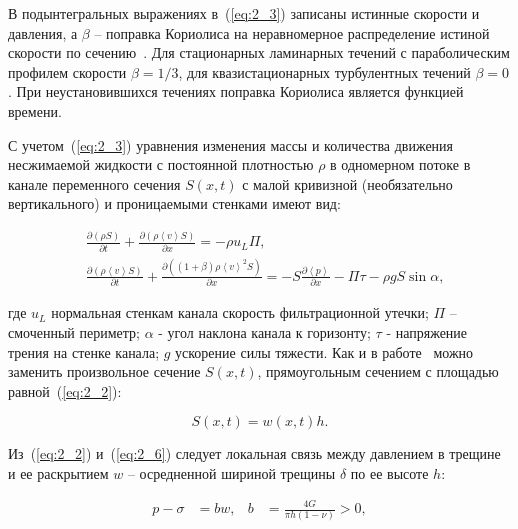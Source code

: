 В подынтегральных выражениях в~(\ref{eq:2_3}) записаны истинные скорости и давления, а $\beta$ – поправка Кориолиса на неравномерное распределение истиной скорости по сечению~\cite{Charniy1}. Для стационарных ламинарных течений с параболическим профилем скорости $\beta = 1/3$, для квазистационарных турбулентных течений $\beta = 0$. При неустановившихся течениях поправка Кориолиса является функцией времени.



С учетом~(\ref{eq:2_3}) уравнения изменения массы и количества движения несжимаемой жидкости с постоянной плотностью $\rho$ в одномерном потоке в канале переменного сечения $S\left(x,t\right)$ с малой кривизной (необязательно вертикального) и проницаемыми стенками имеют вид:

\begin{align}

& \frac{\partial \left(\rho S\right)}{\partial t} + \frac{\partial \left(\rho \left\langle v\right\rangle  S\right)}{\partial x} = - \rho u_L \Pi, \label{eq:2_4} \\

& \frac{\partial \left(\rho \left\langle v\right\rangle  S\right)}{\partial t} + \frac{\partial \left(\left(1+\beta\right) \rho \left\langle v\right\rangle^2 S\right)}{\partial x} = 

-S \frac{\partial \left\langle p\right\rangle}{\partial x} - \Pi \tau - \rho g S \sin \alpha, \label{eq:2_5}

\end{align}

где $u_L$ нормальная стенкам канала скорость фильтрационной утечки; $\Pi$ – смоченный периметр; $\alpha$ - угол наклона канала к горизонту; $\tau$ - напряжение трения на стенке канала; $g$ ускорение силы тяжести. Как и в работе~\cite{Iv_Sm1} можно заменить произвольное сечение $S\left(x,t\right)$, прямоугольным сечением с площадью равной~(\ref{eq:2_2}):

\begin{equation}

S\left(x,t\right) = w\left(x,t\right)h .\label{eq:2_6}

\end{equation}



Из~(\ref{eq:2_2}) и~(\ref{eq:2_6}) следует локальная связь между давлением в трещине и ее раскрытием $w$ – осредненной шириной трещины $\delta$ по ее высоте $h$:

\begin{align}

p - \sigma &= bw, & b & = \frac{4G}{\pi h \left(1-\nu\right)} >0, \label{eq:2_7}

\end{align}

